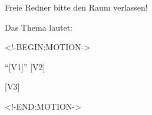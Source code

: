 \documentclass[german,12pt,t]{beamer}
\begin{document}
\begin{frame}
  \vfill
  \begin{center}
    \huge
    Freie Redner bitte den Raum verlassen! 
  \end{center}
  \vfill
\end{frame}


\begin{frame}
  \vfill
  \begin{center}
    \huge
    Das Thema lautet:
  \end{center}
  \vfill
\end{frame}

\begin{frame}
  \vfill
  <!-BEGIN:MOTION-> 
  \begin{center}
    \small\enquote{[V1]} [V2]
  \end{center}
  \pause
  \begin{center}
    \Huge [V3]
  \end{center}
  <!-END:MOTION->
  \vfill
\end{frame}
\end{document}
